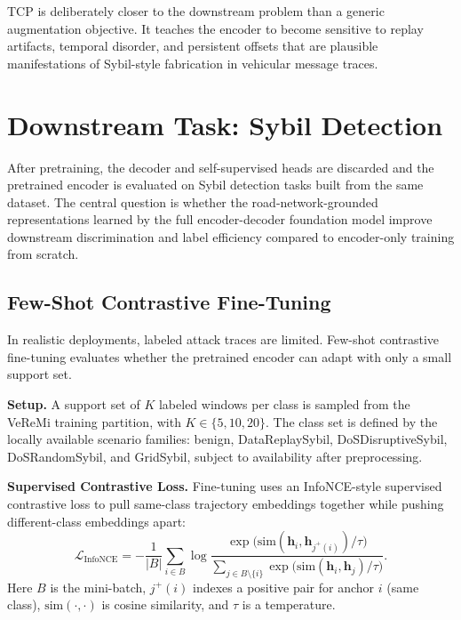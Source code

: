 \documentclass[12pt]{article}
\begin{document}
TCP is deliberately closer to the downstream problem than a generic augmentation objective. It teaches the encoder to become sensitive to replay artifacts, temporal disorder, and persistent offsets that are plausible manifestations of Sybil-style fabrication in vehicular message traces.

\section{Downstream Task: Sybil Detection}

After pretraining, the decoder and self-supervised heads are discarded and the pretrained encoder is evaluated on Sybil detection tasks built from the same dataset. The central question is whether the road-network-grounded representations learned by the full encoder-decoder foundation model improve downstream discrimination and label efficiency compared to encoder-only training from scratch.

\subsection{Few-Shot Contrastive Fine-Tuning}

In realistic deployments, labeled attack traces are limited. Few-shot contrastive fine-tuning evaluates whether the pretrained encoder can adapt with only a small support set.

\textbf{Setup.} A support set of $K$ labeled windows per class is sampled from the VeReMi training partition, with $K \in \{5, 10, 20\}$. The class set is defined by the locally available scenario families: benign, DataReplaySybil, DoSDisruptiveSybil, DoSRandomSybil, and GridSybil, subject to availability after preprocessing.

\textbf{Supervised Contrastive Loss.} Fine-tuning uses an InfoNCE-style supervised contrastive loss \cite{chen2023self,lin2023pre} to pull same-class trajectory embeddings together while pushing different-class embeddings apart:
\begin{equation}
\mathcal{L}_{\text{InfoNCE}} = -\frac{1}{|B|}\sum_{i \in B} \log \frac{\exp\!\bigl(\text{sim}(\mathbf{h}_i, \mathbf{h}_{j^{+}(i)}) / \tau\bigr)}{\sum_{j \in B \setminus \{i\}} \exp\!\bigl(\text{sim}(\mathbf{h}_i, \mathbf{h}_j) / \tau\bigr)}.
\end{equation}
Here $B$ is the mini-batch, $j^{+}(i)$ indexes a positive pair for anchor $i$ (same class), $\text{sim}(\cdot,\cdot)$ is cosine similarity, and $\tau$ is a temperature.
\end{document}
